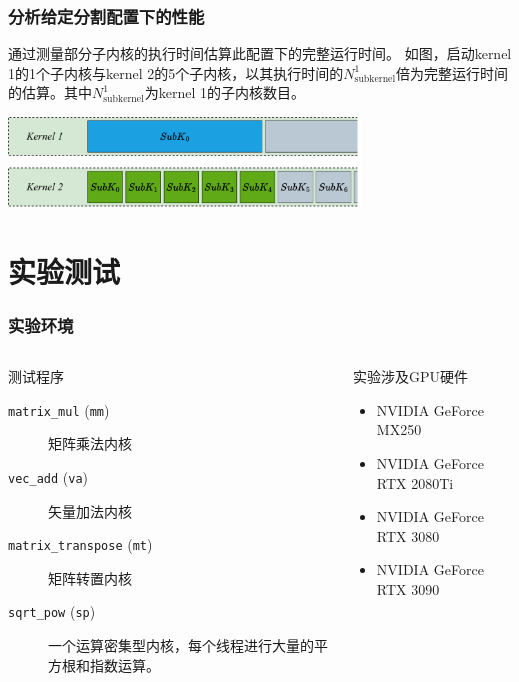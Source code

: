 \documentclass[aspectratio=169]{ctexbeamer}
\begin{document}
\begin{frame}
  \frametitle{分析给定分割配置下的性能}
      通过测量部分子内核的执行时间估算此配置下的完整运行时间。
      \linebreak\linebreak
      如图，启动kernel 1的1个子内核与kernel 2的5个子内核，以其执行时间的$N^1_{\text{subkernel}}$倍为完整运行时间的估算。其中$N^1_{\text{subkernel}}$为kernel 1的子内核数目。
      \begin{center}
        \includegraphics[width=0.7\textwidth]{figures/sampling.drawio.pdf}
      \end{center}
\end{frame}

\section{实验测试}
\begin{frame}
  \frametitle{实验环境}
  \begin{columns}
    \begin{column}{0.6\textwidth}
    \large{测试程序}
      \begin{description}
        \item[\texttt{matrix\_mul} (\texttt{mm})] 矩阵乘法内核
        \item[\texttt{vec\_add} (\texttt{va})] 矢量加法内核
        \item[\texttt{matrix\_transpose} (\texttt{mt})] 矩阵转置内核
        \item[\texttt{sqrt\_pow} (\texttt{sp})] 一个运算密集型内核，每个线程进行大量的平方根和指数运算。
      \end{description}
    \end{column}
    \begin{column}{0.45\textwidth}
      \large{实验涉及GPU硬件}
      \begin{itemize}
        \item NVIDIA GeForce MX250
        \item NVIDIA GeForce RTX 2080Ti
        \item NVIDIA GeForce RTX 3080
        \item NVIDIA GeForce RTX 3090
      \end{itemize}
      \ \\
    \end{column}
  \end{columns}
\end{frame}
\end{document}

